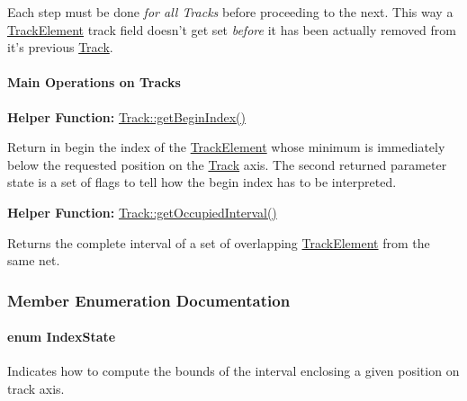 Each step must be done {\itshape for all Tracks} before proceeding to the next. This way a \hyperlink{classKite_1_1TrackElement}{Track\-Element} {\ttfamily track} field doesn't get set {\itshape before} it has been actually removed from it's previous \hyperlink{classKite_1_1Track}{Track}.\hypertarget{classKite_1_1Track_ssecTrackOperations}{}\paragraph{Main Operations on Tracks}\label{classKite_1_1Track_ssecTrackOperations}
{\bfseries Helper Function\-:} \hyperlink{classKite_1_1Track_a7386d7acfcd1dfbeb906bd4c482d797e}{Track\-::get\-Begin\-Index()}

Return in {\ttfamily begin} the index of the \hyperlink{classKite_1_1TrackElement}{Track\-Element} whose minimum is immediately below the requested {\ttfamily position} on the \hyperlink{classKite_1_1Track}{Track} axis. The second returned parameter {\ttfamily state} is a set of flags to tell how the {\ttfamily begin} index has to be interpreted.

{\bfseries Helper Function\-:} \hyperlink{classKite_1_1Track_aeb4b9c2a20ec5f82da8781b11982ae7d}{Track\-::get\-Occupied\-Interval()}

Returns the complete interval of a set of overlapping \hyperlink{classKite_1_1TrackElement}{Track\-Element} from the same net. 

\subsubsection{Member Enumeration Documentation}
\hypertarget{classKite_1_1Track_af4bdc8469c0fee386fc2ff30e0666bca}{
\paragraph[{Index\-State}]{\setlength{\rightskip}{0pt plus 5cm}enum {\bf Index\-State}}}\label{classKite_1_1Track_af4bdc8469c0fee386fc2ff30e0666bca}
Indicates how to compute the bounds of the interval enclosing a given {\ttfamily position} on track axis.

